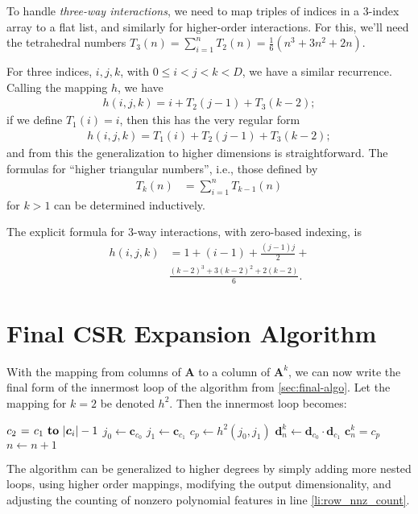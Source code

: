 \documentclass{article}
\begin{document}
To handle \emph{three-way interactions}, we need to map triples of indices in a 3-index array to a flat list, and similarly for higher-order interactions. For this, we'll need the tetrahedral numbers $T_3(n) = \sum_{i=1}^n T_{2}(n) = 
\frac{1}{6}(n^3 + 3n^2 + 2n)$.

For three indices, $i,j,k$, with $0 \le i < j < k < D$, we have a similar recurrence. Calling the mapping $h$, we have 
\begin{align}
h(i,j,k) = i + T_2(j-1) + T_3(k-2);
\end{align}
if we define $T_1(i) = i$, then this has the very regular form
\begin{align}
h(i,j,k) =  T_1(i) + T_2(j-1) + T_3(k-2);
\end{align}
and from this the generalization to higher dimensions is straightforward. The formulas for ``higher triangular numbers'', i.e., those defined by
\begin{align}
T_k(n) &= \sum_{i=1}^n T_{k-1}(n)
\end{align}
for $k > 1$ can be determined inductively.

The explicit formula for 3-way interactions, with zero-based indexing, is 
\begin{align}
h(i, j, k) &= 1 + (i-1) + \frac{(j-1)j}{2} + \\
& \frac{(k-2)^3 + 3(k-2)^2 + 2(k-2)}{6}. 
\end{align}

\section{Final CSR Expansion Algorithm}
With the mapping from columns of $\bm{A}$ to a column of $\bm{A}^k$, we can now write the final form of the innermost loop of the algorithm from \ref{sec:final-algo}.
Let the mapping for $k=2$ be denoted $h^2$.
Then the innermost loop becomes:

\begin{codebox}
\footnotesize
    \zi         \For $c_2 \gets c_1 \To |\bm{c}_i|-1$ \Do
    \zi             $j_0 \gets \bm{c}_{c_0}$
    \zi             $j_1 \gets \bm{c}_{c_1}$
    \zi             $c_p \gets h^2(j_0, j_1)$
    \zi             $\bm{d}^k_{n} \gets \bm{d}_{c_0} \cdot \bm{d}_{c_1}$
    \zi             $\bm{c}^k_{n} = c_p$
    \zi             $n \gets n + 1$
                \End
\end{codebox}

The algorithm can be generalized to higher degrees by simply adding more nested loops, using higher order mappings, modifying the output dimensionality, and adjusting the counting of nonzero polynomial features in line \ref{li:row_nnz_count}.
\end{document}
